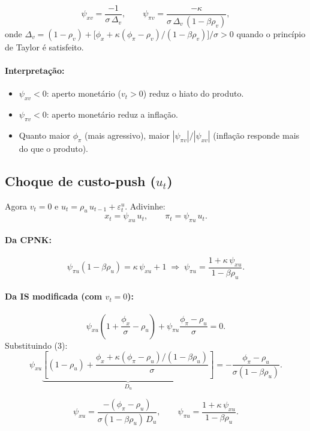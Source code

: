 \documentclass[11pt,a4paper]{article}
\begin{document}
\begin{equation}\label{eq:solution_v}
  \boxed{
    \psi_{xv} = \frac{-1}{\sigma\,\Delta_v},
    \qquad
    \psi_{\pi v} = \frac{-\kappa}{\sigma\,\Delta_v\,(1-\beta\rho_v)},
  }
\end{equation}
onde $\Delta_v = (1-\rho_v) + \bigl[\phi_x + \kappa(\phi_\pi-\rho_v)/(1-\beta\rho_v)\bigr]/\sigma > 0$
quando o princípio de Taylor é satisfeito.

\paragraph{Interpretação:}
\begin{itemize}
  \item $\psi_{xv} < 0$: aperto monetário ($v_t > 0$) reduz o hiato do produto.
  \item $\psi_{\pi v} < 0$: aperto monetário reduz a inflação.
  \item Quanto maior $\phi_\pi$ (mais agressivo), maior $|\psi_{\pi v}|/|\psi_{xv}|$
    (inflação responde mais do que o produto).
\end{itemize}

\subsection{Choque de custo-push ($u_t$)}

Agora $v_t = 0$ e $u_t = \rho_u\,u_{t-1} + \varepsilon_t^u$.
Adivinhe:
\[
  x_t = \psi_{xu}\,u_t, \qquad \pi_t = \psi_{\pi u}\,u_t.
\]

\paragraph{Da CPNK:}
\[
  \psi_{\pi u}(1-\beta\rho_u) = \kappa\,\psi_{xu} + 1
  \;\Longrightarrow\;
  \psi_{\pi u} = \frac{1 + \kappa\,\psi_{xu}}{1-\beta\rho_u}. \tag{3}
\]

\paragraph{Da IS modificada (com $v_t=0$):}
\[
  \psi_{xu}\!\left(1 + \frac{\phi_x}{\sigma} - \rho_u\right)
  + \psi_{\pi u}\!\frac{\phi_\pi - \rho_u}{\sigma} = 0.
\]
Substituindo (3):
\[
  \psi_{xu}\!\underbrace{\left[(1-\rho_u)
    + \frac{\phi_x + \kappa(\phi_\pi-\rho_u)/(1-\beta\rho_u)}{\sigma}\right]}_{D_u}
  = -\frac{\phi_\pi-\rho_u}{\sigma(1-\beta\rho_u)}.
\]

\begin{equation}\label{eq:solution_u}
  \boxed{
    \psi_{xu} = \frac{-(\phi_\pi-\rho_u)}{\sigma(1-\beta\rho_u)\,D_u},
    \qquad
    \psi_{\pi u} = \frac{1 + \kappa\,\psi_{xu}}{1-\beta\rho_u}.
  }
\end{equation}
\end{document}
